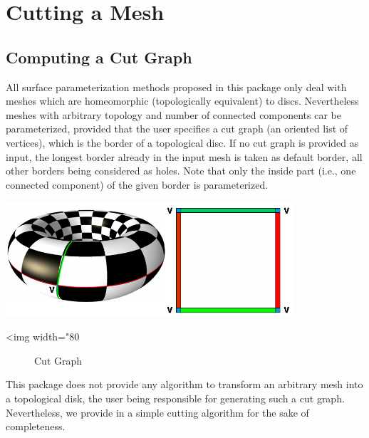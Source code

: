 \section{Cutting a Mesh \label{sec:Cutting-a-Mesh}}

\subsection{Computing a Cut Graph}

All surface parameterization methods proposed in this package only
deal with meshes which are homeomorphic (topologically equivalent) to discs.
Nevertheless meshes with arbitrary topology and number of connected components car be parameterized, provided that the user specifies a cut graph (an oriented list of vertices), which is the border of a topological disc. If no cut graph is
provided as input, the longest border already
in the input mesh is taken as default border, all other borders being considered as holes. Note that only the inside part (i.e., one connected component) of the given border is parameterized.

\begin{center}
    \label{Surface_mesh_parameterization-fig-cut}
    \begin{ccTexOnly}
        \includegraphics[width=0.8\textwidth]{Surface_mesh_parameterization/cut}
    \end{ccTexOnly}
    \begin{ccHtmlOnly}
        <img width="80%
    \end{ccHtmlOnly}
    \begin{figure}[h]
        \caption{Cut Graph}
    \end{figure}
\end{center}

This package does not provide any algorithm to transform an arbitrary mesh
into a topological disk, the user being responsible
for generating such a cut graph. Nevertheless, we provide in
 a simple cutting algorithm for
the sake of completeness.



